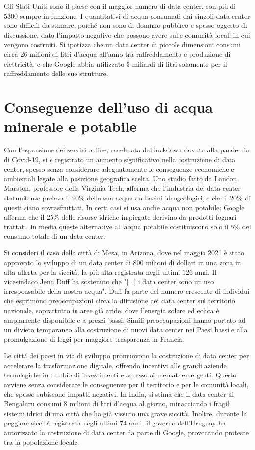 \documentclass[12pt,a4paper,oneside]{book}
\begin{document}
Gli Stati Uniti sono il paese con il maggior numero di data center, con più di 5300 sempre in funzione. I quantitativi di acqua consumati dai singoli data center sono difficili da stimare, poiché non sono di dominio pubblico e spesso oggetto di discussione, dato l'impatto negativo che possono avere sulle comunità locali in cui vengono costruiti. Si ipotizza che un data center di piccole dimensioni consumi circa 26 milioni di litri d'acqua all'anno tra raffreddamento e produzione di elettricità, e che Google abbia utilizzato 5 miliardi di litri solamente per il raffreddamento delle sue strutture.

\section{Conseguenze dell'uso di acqua minerale e potabile}

Con l'espansione dei servizi online, accelerata dal lockdown dovuto alla pandemia di Covid-19, si è registrato un aumento significativo nella costruzione di data center, spesso senza considerare adeguatamente le conseguenze economiche e ambientali legate alla posizione geografica scelta.
Uno studio fatto da Landon Marston, professore della Virginia Tech, afferma che l'industria dei data center statunitense preleva il 90\% della sua acqua da bacini idrogeologici, e che il 20\% di questi siano sovrasfruttati. In certi casi si usa anche acqua non potabile: Google afferma che il 25\%  delle risorse idriche impiegate derivino da prodotti fognari trattati. In media queste alternative all'acqua potabile costituiscono solo il 5\% del consumo totale di un data center. 

Si consideri il caso della città di Mesa, in Arizona, dove nel maggio 2021 è stato approvato lo sviluppo di un data center di 800 milioni di dollari in una zona in alta allerta per la siccità, la più alta registrata negli ultimi 126 anni. Il vicesindaco Jenn Duff ha sostenuto che "[...] i data center sono un uso irresponsabile della nostra acqua". Duff fa parte del numero crescente di individui che esprimono preoccupazioni circa la diffusione dei data center sul territorio nazionale, soprattutto in aree già aride, dove l'energia solare ed eolica è ampiamente disponibile e a prezzi bassi. 
Simili preoccupazioni hanno portato ad un divieto temporaneo alla costruzione di nuovi data center nei Paesi bassi e alla promulgazione di leggi per maggiore trasparenza in Francia.

Le città dei paesi in via di sviluppo promuovono la costruzione di data center per accelerare la trasformazione digitale, offrendo incentivi alle grandi aziende tecnologiche in cambio di investimenti e accesso ai mercati emergenti. Questo avviene senza considerare le conseguenze per il territorio e per le comunità locali, che spesso subiscono impatti negativi.
In India, si stima che il data center di Bengaluru consumi 8 milioni di litri d'acqua al giorno, minacciando i fragili sistemi idrici di una città che ha già vissuto una grave siccità.
Inoltre, durante la peggiore siccità registrata negli ultimi 74 anni, il governo dell'Uruguay ha autorizzato la costruzione di data center da parte di Google, provocando proteste tra la popolazione locale.
\end{document}

